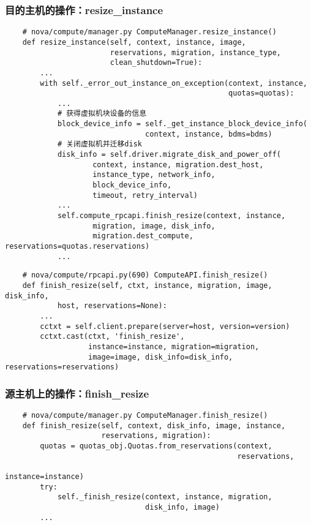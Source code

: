 \documentclass[a4paper,left=1.5cm,right=1.5cm,11pt]{article}
\begin{document}
\subsubsection{目的主机的操作：resize\_instance}
	\begin{lstlisting}
	# nova/compute/manager.py ComputeManager.resize_instance()
	def resize_instance(self, context, instance, image,
                        reservations, migration, instance_type,
                        clean_shutdown=True):
		...
        with self._error_out_instance_on_exception(context, instance,
                                                   quotas=quotas):
			...
			# 获得虚拟机块设备的信息
			block_device_info = self._get_instance_block_device_info(
                                context, instance, bdms=bdms)
			# 关闭虚拟机并迁移disk
            disk_info = self.driver.migrate_disk_and_power_off(
                    context, instance, migration.dest_host,
                    instance_type, network_info,
                    block_device_info,
                    timeout, retry_interval)
			...
            self.compute_rpcapi.finish_resize(context, instance,
                    migration, image, disk_info,
                    migration.dest_compute, reservations=quotas.reservations)
            ...
	\end{lstlisting}

	\begin{lstlisting}
	# nova/compute/rpcapi.py(690) ComputeAPI.finish_resize()
	def finish_resize(self, ctxt, instance, migration, image, disk_info,
            host, reservations=None):
		...
        cctxt = self.client.prepare(server=host, version=version)
        cctxt.cast(ctxt, 'finish_resize',
                   instance=instance, migration=migration,
                   image=image, disk_info=disk_info, reservations=reservations)
	\end{lstlisting}

\subsubsection{源主机上的操作：finish\_resize}
	\begin{lstlisting}
	# nova/compute/manager.py ComputeManager.finish_resize()
	def finish_resize(self, context, disk_info, image, instance,
                      reservations, migration):
        quotas = quotas_obj.Quotas.from_reservations(context,
                                                     reservations,
                                                     instance=instance)
        try:
            self._finish_resize(context, instance, migration,
                                disk_info, image)
        ...
	\end{lstlisting}
\end{document}
